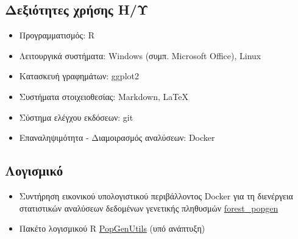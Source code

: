 \documentclass[12pt,]{scrartcl}
\begin{document}
\subsection{Δεξιότητες χρήσης Η/Υ}\label{it}
\begin{itemize}
\vspace{-3mm}
\setlength\itemsep{-0.6em}
\item Προγραμματισμός: R
\item Λειτουργικά συστήματα: Windows (συμπ. Microsoft Office), Linux
\item Κατασκευή γραφημάτων: ggplot2 %
\item Συστήματα στοιχειοθεσίας: Markdown, \LaTeX
\item Σύστημα ελέγχου εκδόσεων: git
\item Επαναληψιμότητα - Διαμοιρασμός αναλύσεων: Docker %
\end{itemize}

\subsection{Λογισμικό}\label{software}
\begin{itemize}
\vspace{-3mm}
\setlength\itemsep{-0.6em}

\item Συντήρηση εικονικού υπολογιστικού περιβάλλοντος Docker για τη διενέργεια στατιστικών αναλύσεων δεδομένων γενετικής πληθυσμών 
\href{https://github.com/nikostourvas/forest_popgen}{forest\_popgen}

\item Πακέτο λογισμικού R \href{https://github.com/nikostourvas/PopGenUtils}{PopGenUtils} (υπό ανάπτυξη)

\end{itemize}
\end{document}

